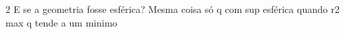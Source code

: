 \documentclass[\mainfilename]{subfiles}
\begin{document}
\begin{questionBox}
    \begin{questionBox}2{ %
        E se a geometria fosse esférica?
    } %
        Mesma coisa só q com sup esférica
        quando r2 max q tende a um minimo
    \end{questionBox}
\end{questionBox}

\end{document}
